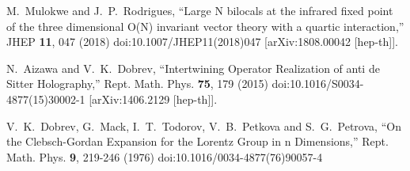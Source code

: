 \documentclass[a4paper,12pt]{article}
\begin{document}
\begin{thebibliography}{}
M.~Mulokwe and J.~P.~Rodrigues,
``Large N bilocals at the infrared fixed point of the three dimensional O(N) invariant vector theory with a quartic interaction,''
JHEP \textbf{11}, 047 (2018)
doi:10.1007/JHEP11(2018)047
[arXiv:1808.00042 [hep-th]].

N.~Aizawa and V.~K.~Dobrev,
``Intertwining Operator Realization of anti de Sitter Holography,''
Rept. Math. Phys. \textbf{75}, 179 (2015)
doi:10.1016/S0034-4877(15)30002-1
[arXiv:1406.2129 [hep-th]].

V.~K.~Dobrev, G.~Mack, I.~T.~Todorov, V.~B.~Petkova and S.~G.~Petrova,
``On the Clebsch-Gordan Expansion for the Lorentz Group in n Dimensions,''
Rept. Math. Phys. \textbf{9}, 219-246 (1976)
doi:10.1016/0034-4877(76)90057-4


\end{thebibliography}
\end{document}
